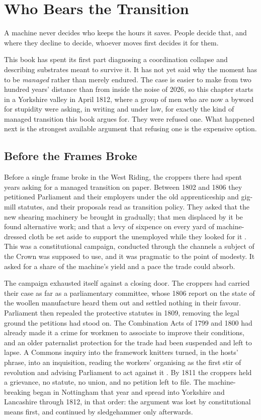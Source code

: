 \chapter{Who Bears the Transition}
\label{ch:managing-moment}

\epigraph{A machine never decides who keeps the hours it saves. People decide that, and where they decline to decide, whoever moves first decides it for them.}{}

This book has spent its first part diagnosing a coordination collapse and describing substrates meant to survive it. It has not yet said why the moment has to be \emph{managed} rather than merely endured. The case is easier to make from two hundred years' distance than from inside the noise of 2026, so this chapter starts in a Yorkshire valley in April 1812, where a group of men who are now a byword for stupidity were asking, in writing and under law, for exactly the kind of managed transition this book argues for. They were refused one. What happened next is the strongest available argument that refusing one is the expensive option.

\section{Before the Frames Broke}

Before a single frame broke in the West Riding, the croppers there had spent years asking for a managed transition on paper. Between 1802 and 1806 they petitioned Parliament and their employers under the old apprenticeship and gig-mill statutes, and their proposals read as transition policy. They asked that the new shearing machinery be brought in gradually; that men displaced by it be found alternative work; and that a levy of sixpence on every yard of machine-dressed cloth be set aside to support the unemployed while they looked for it \parencite{Thompson1963,Randall1991}. This was a constitutional campaign, conducted through the channels a subject of the Crown was supposed to use, and it was pragmatic to the point of modesty. It asked for a share of the machine's yield and a pace the trade could absorb.

The campaign exhausted itself against a closing door. The croppers had carried their case as far as a parliamentary committee, whose 1806 report on the state of the woollen manufacture heard them out and settled nothing in their favour. Parliament then repealed the protective statutes in 1809, removing the legal ground the petitions had stood on. The Combination Acts of 1799 and 1800 had already made it a crime for workmen to associate to improve their conditions, and an older paternalist protection for the trade had been suspended and left to lapse. A Commons inquiry into the framework knitters turned, in the hosts' phrase, into an inquisition, reading the workers' organising as the first stir of revolution and advising Parliament to act against it \parencite{LynskeyDunt2026Luddites}. By 1811 the croppers held a grievance, no statute, no union, and no petition left to file. The machine-breaking began in Nottingham that year and spread into Yorkshire and Lancashire through 1812, in that order: the argument was lost by constitutional means first, and continued by sledgehammer only afterwards.

